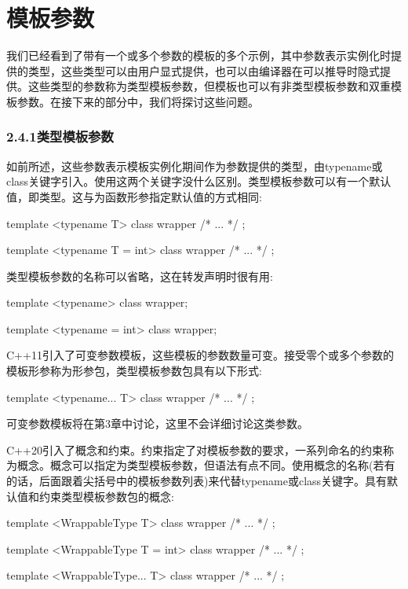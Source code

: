 \section{模板参数}

我们已经看到了带有一个或多个参数的模板的多个示例，其中参数表示实例化时提供的类型，这些类型可以由用户显式提供，也可以由编译器在可以推导时隐式提供。这些类型的参数称为类型模板参数，但模板也可以有非类型模板参数和双重模板参数。在接下来的部分中，我们将探讨这些问题。

\subsubsection{2.4.1\hspace{0.2cm}类型模板参数}

如前所述，这些参数表示模板实例化期间作为参数提供的类型，由typename或class关键字引入。使用这两个关键字没什么区别。类型模板参数可以有一个默认值，即类型。这与为函数形参指定默认值的方式相同:

\begin{cpp}
template <typename T>
class wrapper { /* ... */ };

template <typename T = int>
class wrapper { /* ... */ };
\end{cpp}

类型模板参数的名称可以省略，这在转发声明时很有用:

\begin{cpp}
template <typename>
class wrapper;

template <typename = int>
class wrapper;
\end{cpp}

C++11引入了可变参数模板，这些模板的参数数量可变。接受零个或多个参数的模板形参称为形参包，类型模板参数包具有以下形式:

\begin{cpp}
template <typename... T>
class wrapper { /* ... */ };
\end{cpp}

可变参数模板将在第3章中讨论，这里不会详细讨论这类参数。

C++20引入了概念和约束。约束指定了对模板参数的要求，一系列命名的约束称为概念。概念可以指定为类型模板参数，但语法有点不同。使用概念的名称(若有的话，后面跟着尖括号中的模板参数列表)来代替typename或class关键字。具有默认值和约束类型模板参数包的概念:

\begin{cpp}
template <WrappableType T>
class wrapper { /* ... */ };

template <WrappableType T = int>
class wrapper { /* ... */ };

template <WrappableType... T>
class wrapper { /* ... */ };
\end{cpp}


